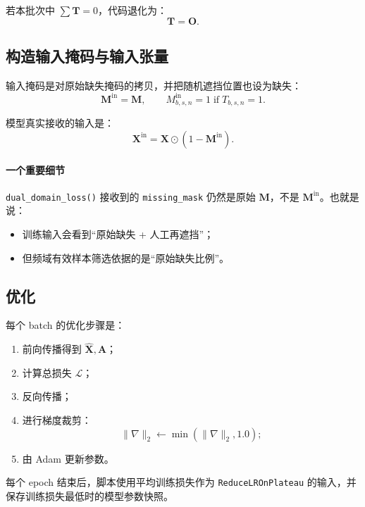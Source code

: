 \documentclass[UTF8]{ctexart}
\begin{document}
若本批次中 $\sum \bm{T}=0$，代码退化为：
\begin{equation}
    \bm{T} = \bm{O}.
\end{equation}

\subsection{构造输入掩码与输入张量}

输入掩码是对原始缺失掩码的拷贝，并把随机遮挡位置也设为缺失：
\begin{equation}
    \bm{M}^{\text{in}} = \bm{M}, \qquad
    M^{\text{in}}_{b,s,n} = 1 \;\text{if}\; T_{b,s,n}=1.
\end{equation}

模型真实接收的输入是：
\begin{equation}
    \bm{X}^{\text{in}} = \bm{X} \odot (1-\bm{M}^{\text{in}}).
\end{equation}

\paragraph{一个重要细节}
\texttt{dual\_domain\_loss()} 接收到的 \texttt{missing\_mask} 仍然是原始 $\bm{M}$，不是 $\bm{M}^{\text{in}}$。也就是说：
\begin{itemize}
    \item 训练输入会看到“原始缺失 + 人工再遮挡”；
    \item 但频域有效样本筛选依据的是“原始缺失比例”。
\end{itemize}

\subsection{优化}

每个 batch 的优化步骤是：
\begin{enumerate}
    \item 前向传播得到 $\hat{\bm{X}}, \bm{A}$；
    \item 计算总损失 $\mathcal{L}$；
    \item 反向传播；
    \item 进行梯度裁剪：
    \begin{equation}
        \|\nabla\|_2 \leftarrow \min(\|\nabla\|_2, 1.0);
    \end{equation}
    \item 由 Adam 更新参数。
\end{enumerate}

每个 epoch 结束后，脚本使用平均训练损失作为 \texttt{ReduceLROnPlateau} 的输入，并保存训练损失最低时的模型参数快照。
\end{document}
